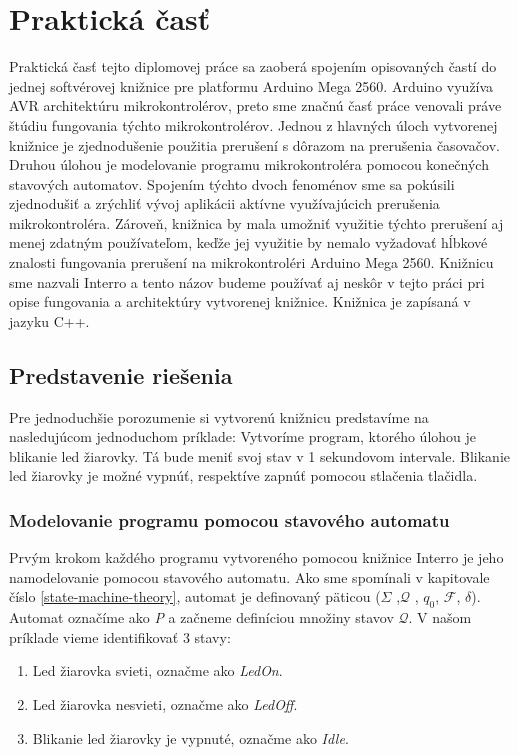 \section{Praktická časť}
\noindent

Praktická časť tejto diplomovej práce sa zaoberá spojením opisovaných častí do jednej softvérovej knižnice pre platformu Arduino Mega 2560. Arduino využíva AVR
architektúru mikrokontrolérov, preto sme značnú časť práce venovali práve štúdiu fungovania týchto mikrokontrolérov.
Jednou z hlavných úloch vytvorenej knižnice je zjednodušenie použitia prerušení s dôrazom na prerušenia časovačov.
Druhou úlohou je modelovanie programu mikrokontroléra pomocou konečných stavových automatov. Spojením týchto dvoch fenoménov sme sa pokúsili zjednodušiť
a zrýchliť vývoj aplikácii aktívne využívajúcich prerušenia mikrokontroléra. Zároveň, knižnica by mala umožniť využitie týchto prerušení aj menej zdatným
používateľom, keďže jej využitie by nemalo vyžadovať hĺbkové znalosti fungovania prerušení na mikrokontroléri Arduino Mega 2560. Knižnicu sme nazvali Interro
a tento názov budeme používať aj neskôr v tejto práci pri opise fungovania a architektúry vytvorenej knižnice. Knižnica je zapísaná v jazyku C++.

\subsection{Predstavenie riešenia}
\noindent
Pre jednoduchšie porozumenie si vytvorenú knižnicu predstavíme na nasledujúcom jednoduchom príklade: Vytvoríme program, ktorého úlohou je blikanie led žiarovky.
Tá bude meniť svoj stav v 1 sekundovom intervale. Blikanie led žiarovky je možné vypnúť, respektíve zapnúť pomocou stlačenia tlačidla.

\subsubsection{Modelovanie programu pomocou stavového automatu}
\noindent
Prvým krokom každého programu vytvoreného pomocou knižnice Interro je jeho namodelovanie pomocou stavového automatu.
Ako sme spomínali v kapitovale číslo \ref{state-machine-theory}, automat je definovaný päticou ($\Sigma$ ,$\mathcal{Q}$ , $q_0$, $\mathcal{F}$, $\delta$).
Automat označíme ako \textit{P} a začneme definíciou množiny stavov $\mathcal{Q}$. V našom príklade vieme identifikovať 3 stavy:
\begin{enumerate}
    \item Led žiarovka svieti, označme ako \textit{LedOn}.
    \item Led žiarovka nesvieti, označme ako \textit{LedOff}.
    \item Blikanie led žiarovky je vypnuté, označme ako \textit{Idle}.
\end{enumerate}

